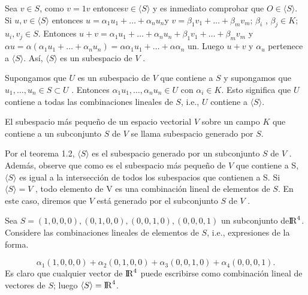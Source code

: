  	   			\begin{demo}
 	   				Sea $ v \in S $, como $ v = 1v $ entonces$  v \in \langle S \rangle $ y es inmediato
 	   				comprobar que $ O \in \langle S \rangle $. Si $ u, v \in \langle S \rangle $ entonces $ u = \alpha_{1} u_{1} + \ldots + \alpha_{n} u_{n} $y $ v = \beta_{1} v_{1} + \ldots + \beta_{m}v_{m}  $; $ \beta_{i} $ , $\beta_{j} \in K $; $ u_{i} ,v_{j} \in S $. Entonces $ u + v = \alpha_{1} u_{1} + \ldots + \alpha_{n} u_{n} +\beta_{1} v_{1} + \ldots+ \beta_{m} v_{m} $ y $\alpha u = \alpha(\alpha_{1} u_{1} + \ldots+ \alpha_{n} u_{n} ) = \alpha \alpha_{1} u_{1} + \ldots + \alpha \alpha_{n} $ un. Luego $ u + v $ y $\alpha_{u}$ pertenece a $ \langle S \rangle $. Así, $ \langle S \rangle $ es un subespacio de $ V $ .
 	   			\end{demo}
    			Supongamos que $ U $ es un subespacio de $ V $ que contiene a $ S $ y supongamos que
    			$ u_{1} , \ldots , u_{n} \in S \subset U $ . Entonces $ \alpha_{1} u_{1} ,\ldots , \alpha_{n} u_{n} \in U $ con $\alpha_{i} \in K$. Esto significa que $ U $ contiene a todas las combinaciones lineales de $ S $, i.e., $ U $ contiene a $ \langle S \rangle $.
    			\begin{defi}
    				El subespacio más pequeño de un espacio vectorial $ V $ sobre un campo $ K $ que contiene a un subconjunto $ S $ de $ V $ se llama subespacio generado por $ S $.
    			\end{defi}
    		Por el teorema 1.2, $ \langle S \rangle $ es el subespacio generado por un subconjunto $ S $ de
    		$ V $ . Además, observe que como es el subespacio más pequeño de $ V $ que contiene
    		a S,$ \langle S \rangle $ es igual a la intersección de todos los subespacios que contienen a S. Si
    		$ \langle S \rangle = V$ , todo elemento de V es una combinación lineal de elementos de $ S $. En este caso, diremos que $ V $ está generado por el subconjunto $ S $ de $ V $ . 
    		
    		\begin{ejem}
    		Sea $ S = {(1, 0, 0, 0), (0, 1, 0, 0), (0, 0, 1, 0), (0, 0, 0, 1)} $ un subconjunto de$  {\rm I\!R}^{4} $. Considere las combinaciones lineales de elementos de $ S $, i.e., expresiones de la forma.
    		
    		\[ \alpha_{1}(1, 0, 0, 0) + \alpha_{2} (0, 1, 0, 0) + \alpha_{3} (0, 0, 1, 0) + \alpha_{4} (0, 0, 0, 1).
    		 \]
    		 Es claro que cualquier vector de $ {\rm I\!R}^{4} $ puede escribirse como combinación lineal de vectores de $ S $; luego $ \langle S \rangle  = {\rm I\!R}^{4} $.
    		 \end{ejem}
